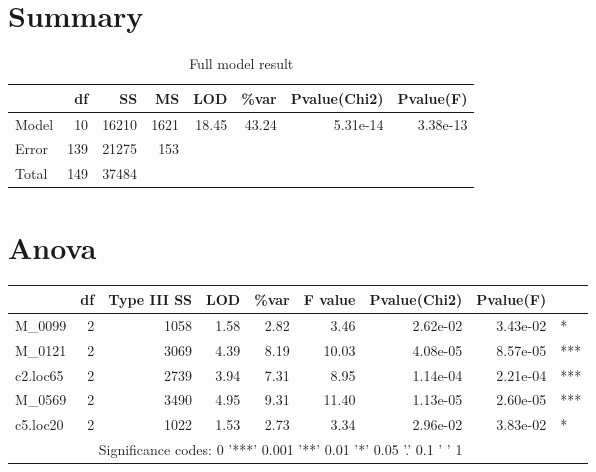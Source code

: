 \documentclass[a4paper,11pt]{article}\usepackage[]{graphicx}\usepackage[]{color}
\begin{document}
\section{Summary}
\begin{table}[ht]
\begin{flushleft}
\caption{Full model result} 
\label{modRes}
\begin{tabular}{lrrrrrrr}
  \hline
 & df & SS & MS & LOD & \%var & Pvalue(Chi2) & Pvalue(F) \\ 
  \hline
Model & 10 & 16210 & 1621 & 18.45 & 43.24 & 5.31e-14 & 3.38e-13 \\ 
  Error & 139 & 21275 & 153 &  &  &  &  \\ 
  Total & 149 & 37484 &  &  &  &  &  \\ 
   \hline
\end{tabular}
\end{flushleft}
\end{table}

\section{Anova}
\begin{table}[ht]
\begin{flushleft}
\begin{tabular}{lrrrrrrrl}
  \hline
 & df & Type III SS & LOD & \%var & F value & Pvalue(Chi2) & Pvalue(F) &  \\ 
  \hline
M\_0099 & 2 & 1058 & 1.58 & 2.82 & 3.46 & 2.62e-02 & 3.43e-02 & * \\ 
  M\_0121 & 2 & 3069 & 4.39 & 8.19 & 10.03 & 4.08e-05 & 8.57e-05 & *** \\ 
  c2.loc65 & 2 & 2739 & 3.94 & 7.31 & 8.95 & 1.14e-04 & 2.21e-04 & *** \\ 
  M\_0569 & 2 & 3490 & 4.95 & 9.31 & 11.40 & 1.13e-05 & 2.60e-05 & *** \\ 
  c5.loc20 & 2 & 1022 & 1.53 & 2.73 & 3.34 & 2.96e-02 & 3.83e-02 & * \\ 
   \hline  \multicolumn{8}{c}{Significance codes:  0 '***' 0.001 '**' 0.01 '*' 0.05 '.' 0.1 ' ' 1} \\ \hline
\end{tabular}
\label{anova}
\end{flushleft}
\end{table}
\end{document}

